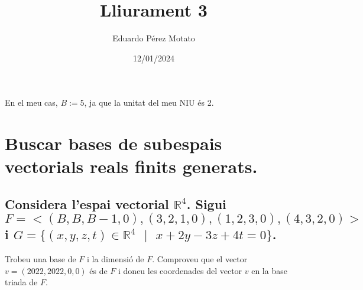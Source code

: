 \documentclass[a4paper, 12pt]{article}
\title{Lliurament 3}
\author{Eduardo Pérez Motato}
\date{12/01/2024}
\begin{document}
    \makeheader
    \begin{center}
        En el meu cas, $B := 5$, ja que la unitat del meu NIU és 2.
    \end{center}
    \section{Buscar bases de subespais vectorials reals finits generats.}
    \subsection{Considera l'espai vectorial $\mathbb{R}^4$. Sigui $F=<(B, B, B-1, 0), (3, 2, 1, 0), (1, 2, 3, 0), (4, 3, 2, 0)>$
    i $G = \{(x, y, z, t) \in \mathbb{R}^4\text{ }|\text{ }x + 2y - 3z + 4t = 0\}$.}
    \begin{exercici}
        Trobeu una base de $F$ i la dimensió de $F$. Comproveu que el vector $v = (2022, 2022, 0, 0)$
        és de $F$ i doneu les coordenades del vector $v$ en la base triada de $F$.
    \end{exercici}
\end{document}
